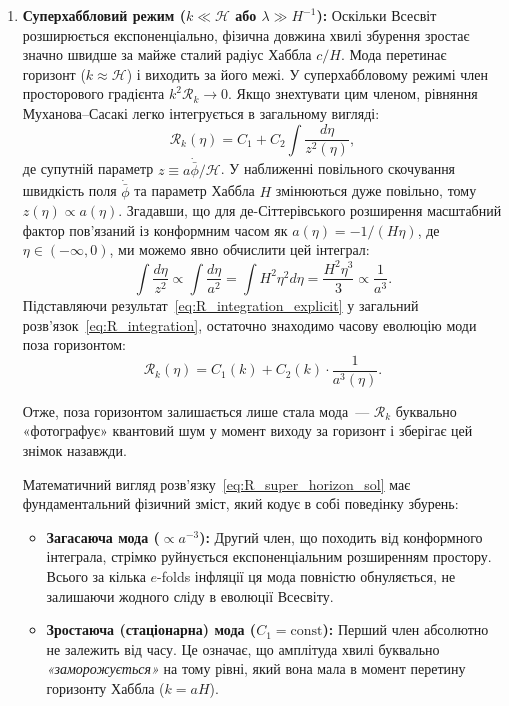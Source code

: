 \begin{enumerate}
\item \textbf{Суперхаббловий режим ($k \ll \mathcal{H}$ або $\lambda \gg H^{-1}$):}
  Оскільки Всесвіт розширюється експоненціально, фізична довжина хвилі збурення зростає значно швидше за майже сталий радіус Хаббла $c/H$. Мода перетинає горизонт ($k \approx \mathcal{H}$) і виходить за його межі. У суперхаббловому режимі член просторового градієнта $k^2\mathcal{R}_k \to 0$. Якщо знехтувати цим членом, рівняння Муханова--Сасакі легко інтегрується в загальному вигляді:
  \begin{equation}\label{eq:R_integration}
    \mathcal{R}_k(\eta) = C_1 + C_2 \int \frac{d\eta}{z^2(\eta)},
  \end{equation}
  де супутній параметр $z \equiv a \dot{\bar{\phi}} / \mathcal{H}$. У наближенні повільного скочування швидкість поля $\dot{\bar{\phi}}$ та параметр Хаббла $H$ змінюються дуже повільно, тому $z(\eta) \propto a(\eta)$. Згадавши, що для де-Сіттерівського розширення масштабний фактор пов'язаний із конформним часом як $a(\eta) = -1/(H\eta)$, де $\eta \in (-\infty, 0)$, ми можемо явно обчислити цей інтеграл:
  \begin{equation}\label{eq:R_integration_explicit}
    \int \frac{d\eta}{z^2} \propto \int \frac{d\eta}{a^2} = \int H^2 \eta^2 d\eta = \frac{H^2 \eta^3}{3} \propto \frac{1}{a^3}.
  \end{equation}
  Підставляючи результат~\eqref{eq:R_integration_explicit} у загальний розв'язок~\eqref{eq:R_integration}, остаточно знаходимо часову еволюцію моди поза горизонтом:
  \begin{equation}\label{eq:R_super_horizon_sol}
    \mathcal{R}_k(\eta) = C_1 (k) + C_2 (k) \cdot \frac{1}{a^3(\eta)}.
  \end{equation}

    Отже, поза горизонтом залишається лише стала мода~---
    $\mathcal{R}_k$ буквально «фотографує» квантовий шум
    у момент виходу за горизонт і зберігає цей знімок назавжди.

  Математичний вигляд розв'язку~\eqref{eq:R_super_horizon_sol} має фундаментальний фізичний зміст, який кодує в собі поведінку збурень:
  \begin{itemize}
    \item \textbf{Загасаюча мода ($\propto a^{-3}$):} Другий член, що походить від конформного інтеграла, стрімко руйнується експоненціальним розширенням простору. Всього за кілька $e$-folds інфляції ця мода повністю обнуляється, не залишаючи жодного сліду в еволюції Всесвіту.
    \item \textbf{Зростаюча (стаціонарна) мода ($C_1 = \mathrm{const}$):} Перший член абсолютно не залежить від часу. Це означає, що амплітуда хвилі буквально \emph{«заморожується»} на тому рівні, який вона мала в момент перетину горизонту Хаббла ($k = aH$).
  \end{itemize}


\end{enumerate}
